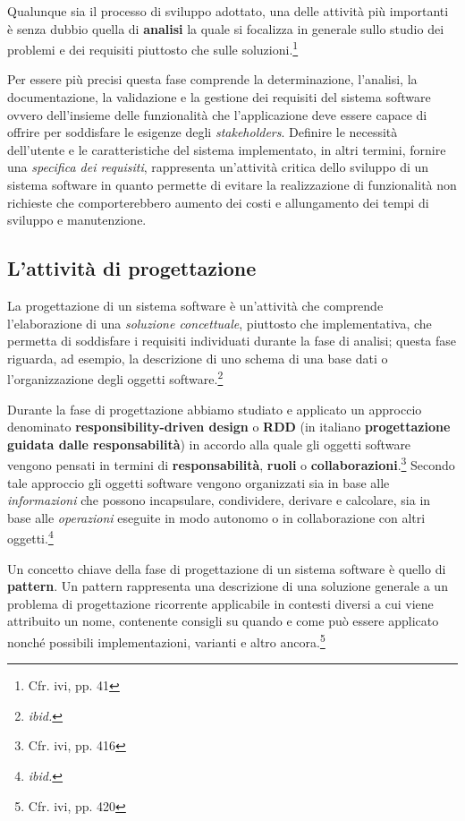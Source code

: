 \documentclass[10pt,a4paper, titlepage]{article}
\begin{document}
Qualunque sia il processo di sviluppo adottato, una delle attività più importanti è senza dubbio quella di \textbf{analisi} la quale si focalizza in generale sullo studio dei problemi e dei requisiti piuttosto che sulle soluzioni.\footnote{Cfr. ivi, pp. 41}

Per essere più precisi questa fase comprende la determinazione, l'analisi, la documentazione, la validazione e la gestione dei requisiti del sistema software ovvero dell'insieme delle funzionalità che l'applicazione deve essere capace di offrire per soddisfare le esigenze degli \textit{stakeholders}. Definire le necessità dell'utente e le caratteristiche del sistema implementato, in altri termini, fornire una \textit{specifica dei requisiti}, rappresenta un'attività critica dello sviluppo di un sistema software in quanto permette di evitare la realizzazione di funzionalità non richieste che comporterebbero aumento dei costi e allungamento dei tempi di sviluppo e manutenzione.

\subsection{L'attività di progettazione}

La progettazione di un sistema software è un'attività che comprende l'elaborazione di una \textit{soluzione concettuale}, piuttosto che implementativa, che permetta di soddisfare i requisiti individuati durante la fase di analisi; questa fase riguarda, ad esempio, la descrizione di uno schema di una base dati o l'organizzazione degli oggetti software.\footnote{\textit{ibid.}}

Durante la fase di progettazione abbiamo studiato e applicato un approccio denominato \textbf{responsibility-driven design} o \textbf{RDD} (in italiano \textbf{progettazione guidata dalle responsabilità}) in accordo alla quale gli oggetti software vengono pensati in termini di \textbf{responsabilità}, \textbf{ruoli} o \textbf{collaborazioni}.\footnote{Cfr. ivi, pp. 416} Secondo tale approccio gli oggetti software vengono organizzati sia in base alle \textit{informazioni} che possono incapsulare, condividere, derivare e calcolare, sia in base alle \textit{operazioni} eseguite in modo autonomo o in collaborazione con altri oggetti.\footnote{\textit{ibid.}}

Un concetto chiave della fase di progettazione di un sistema software è quello di \textbf{pattern}. Un pattern rappresenta una descrizione di una soluzione generale a un problema di progettazione ricorrente applicabile in contesti diversi a cui viene attribuito un nome, contenente consigli su quando e come può essere applicato nonché possibili implementazioni, varianti e altro ancora.\footnote{Cfr. ivi, pp. 420}
\end{document}
